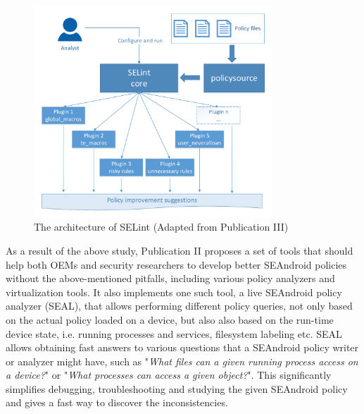 \begin{figure}[t]
	\centering
		\includegraphics[width=0.80\textwidth]{figures/selint-archi.pdf}
	\caption{The architecture of SELint (Adapted from Publication III)}
	\label{fig:selint}
\end{figure}

As a result of the above study, Publication II proposes a set of tools that should help both OEMs and security researchers to develop better SEAndroid policies without the above-mentioned pitfalls, including various policy analyzers and virtualization tools. It also implements one such tool, a live SEAndroid policy analyzer (SEAL), that allows performing different policy queries, not only based on the actual policy loaded on a device, but also also based on the run-time device state, i.e. running processes and services, filesystem labeling etc. SEAL allows obtaining fast answers to various questions that a SEAndroid policy writer or analyzer might have, such as "\textit{What files can a given running process access on a device?}" or "\textit{What processes can access a given object?}". This significantly simplifies debugging, troubleshooting and studying the given SEAndroid policy and gives a fast way to discover the inconsistencies. 

